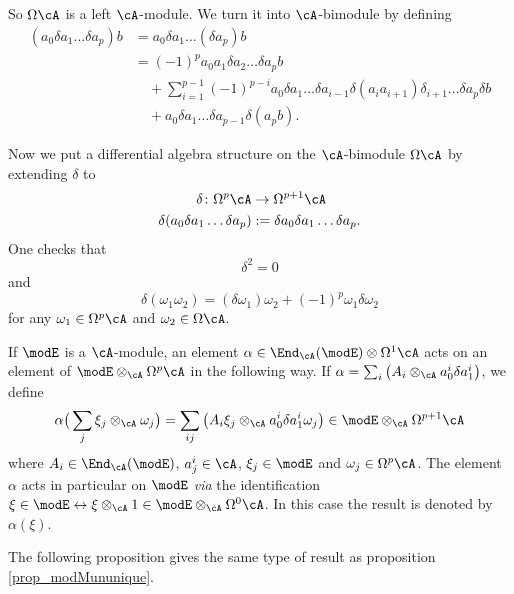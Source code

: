 So $\Omega\cA$ is a left $\cA$-module. We turn it into $\cA$-bimodule by defining
\begin{equation}
\begin{split}
(a_0\delta a_1\ldots\delta a_p)b&=a_0\delta a_1\ldots(\delta a_p)b\\
		&=(-1)^pa_0a_1\delta a_2\ldots \delta a_p b\\
		&\quad+\sum_{i=1}^{p-1}(-1)^{p-i}a_0 \delta a_1\ldots \delta a_{i-1}\delta(a_ia_{i+1})\delta_{i+1}\ldots\delta a_p\delta b\\
		&\quad+a_0\delta a_1\ldots\delta a_{p-1}\delta(a_pb).
\end{split}
\end{equation}

Now we put a differential algebra structure on the $\cA$-bimodule $\Omega\cA$ by extending $\delta$ to
\begin{equation}
\begin{aligned}
 \delta\colon\Omega^p\cA&\to \Omega^{p+1}\cA \\ 
\delta(a_0\delta a_1\ldots\delta a_p)&:= \delta a_0\delta a_1\ldots \delta a_p. 
\end{aligned}
\end{equation}
One checks that
\[ 
  \delta^2=0
\]
and
\begin{equation}
  \delta(\omega_1\omega_2)=(\delta\omega_1)\omega_2+(-1)^p\omega_1\delta\omega_2
\end{equation}
for any $\omega_1\in\Omega^p\cA$ and $\omega_2\in\Omega\cA$.

If $\modE$ is a $\cA$-module, an element $\alpha\in\End_{\cA}(\modE)\otimes\Omega^1\cA$ acts on an element of $\modE\otimes_{\cA}\Omega^p\cA$ in the following way. If $\alpha=\sum_i\big( A_i\otimes_{\cA}a^i_0\delta a^i_1 \big)$, we define
\begin{equation}		\label{EqActallphaEOAp}
\alpha\big( \sum_j\xi_j\otimes_{\cA}\omega_j \big)=\sum_{ij}\big( A_i\xi_j\otimes_{\cA}a^i_0\delta a^i_1\omega_j \big)\in\modE\otimes_{\cA}\Omega^{p+1}\cA
\end{equation}
where $A_i\in\End_{\cA}(\modE)$, $a^i_j\in\cA$, $\xi_j\in\modE$ and $\omega_j\in\Omega^p\cA$. The element $\alpha$ acts in particular on $\modE$ \emph{via} the identification $\xi\in\modE\leftrightarrow\xi\otimes_{\cA}1\in\modE\otimes_{\cA}\Omega^0\cA$. In this case the result is denoted by $\alpha(\xi)$.

The following proposition gives the same type of result as proposition  \ref{prop_modMununique}.

